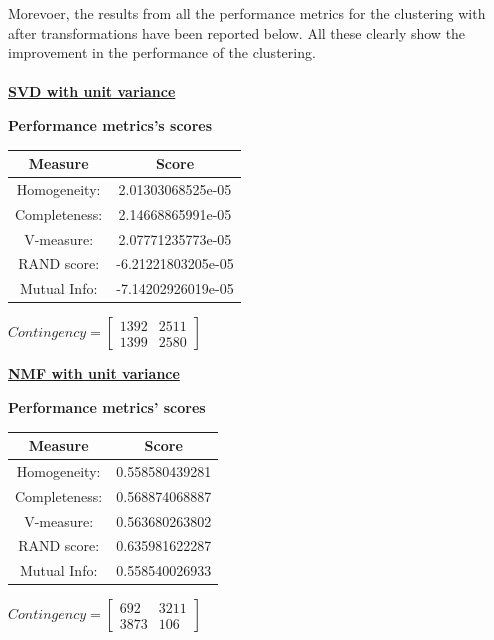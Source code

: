 \documentclass{report}
\begin{document}
Morevoer, the results from all the performance metrics for the clustering with after transformations have been reported below. All these clearly show the improvement in the performance of the clustering. \\ \\



\underline{\textbf{SVD with unit variance}} \\

\begin{center}
	\textbf{Performance metrics's scores} \\ \vspace{10pt}	
	\begin{tabular}{*{2}{c}}
		\toprule
		\textbf{Measure} & \textbf{Score} \\		
		\midrule
		Homogeneity: 		& 2.01303068525e-05 \\
		\midrule
		Completeness: 		& 2.14668865991e-05 \\
		\midrule
		V-measure: 			& 2.07771235773e-05 \\
		\midrule
		RAND score: 		& -6.21221803205e-05 \\
		\midrule
		Mutual Info: 		& -7.14202926019e-05 \\
		\bottomrule
	\end{tabular}
	\qquad
	$Contingency = \left[\begin{array}{*{2}{c}}
		1392 		& 2511 \\
		1399 		& 2580 
			\end{array}\right]
		$
\end{center}


\underline{\textbf{NMF with unit variance}} \\

\begin{center}
	\textbf{Performance metrics' scores} \\ \vspace{10pt}		
	\begin{tabular}{*{2}{c}}	
		\toprule
		\textbf{Measure} & \textbf{Score} \\		
		\midrule
		Homogeneity: 		& 0.558580439281 \\
		\midrule
		Completeness: 		& 0.568874068887 \\
		\midrule
		V-measure: 			& 0.563680263802 \\
		\midrule
		RAND score: 		& 0.635981622287 \\
		\midrule
		Mutual Info: 		& 0.558540026933 \\
		\bottomrule
	\end{tabular}
	\qquad	
	$Contingency = \left[ \begin{array}{*{2}{c}}
		692 		& 3211 \\
		3873  		& 106 
			\end{array}\right]
		$
\end{center}
\\
\end{document}
